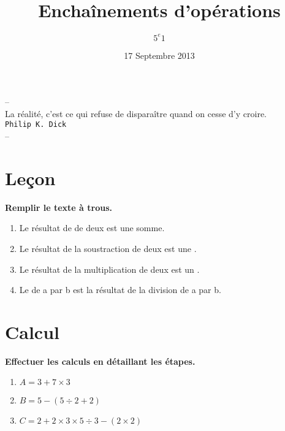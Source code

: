 \documentclass[11pt]{article}
\title{Enchaînements d'opérations} %
\author{$5^e 1$}
\date{17 Septembre 2013} %
\begin{document}
\maketitle %

\begin{center}
\textsf{--}\\
\textsf{La réalité, c'est ce qui refuse de disparaître quand on cesse d'y croire.}\\
\texttt{Philip K. Dick}\\
\textsf{--}
\end{center}

\thispagestyle{empty}

\section{Leçon}
\textbf{Remplir le texte à trous.}

\begin{enumerate}
\item Le résultat de \underline{\phantom{l'addition11111}} de deux \underline{\phantom{termes1111}} est une somme.\\
\item Le résultat de la soustraction de deux \underline{\phantom{termes1111}} est une \underline{\phantom{différence1111}}.\\
\item Le résultat de la multiplication de deux \underline{\phantom{facteurs1111}} est un \underline{\phantom{produit1111}}.\\
\item Le \underline{\phantom{quotient1111}} de a par b est la résultat de la division de a par b.
\end{enumerate}


\vspace{1cm}
\section{Calcul}
\textbf{Effectuer les calculs en détaillant les étapes.}

\begin{enumerate}
\item $A = 3 + 7 \times 3 $\\
\item $B = 5 - (5 \div 2  + 2)$\\
\item $C = 2 + 2 \times 3 \times 5 \div 3 - (2 \times 2)$
\end{enumerate}
\end{document}
